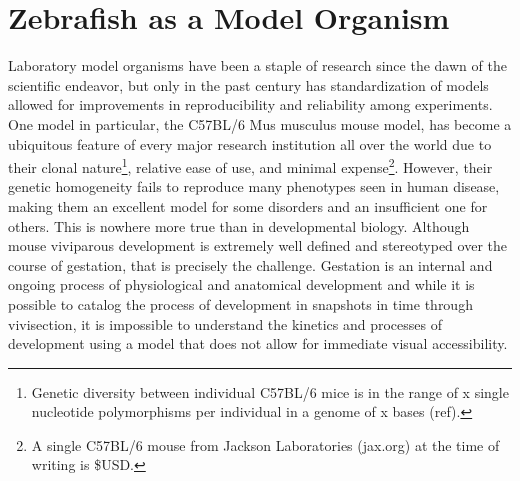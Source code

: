 



\section{Zebrafish as a Model Organism}

Laboratory model organisms have been a staple of research since the dawn of the scientific endeavor, but only in the past century has standardization of models allowed for improvements in reproducibility and reliability among experiments. One model in particular, the C57BL/6 Mus musculus mouse model, has become a ubiquitous feature of every major research institution all over the world due to their clonal nature\footnote{Genetic diversity between individual C57BL/6 mice is in the range of x single nucleotide polymorphisms per individual in a genome of x bases (ref).}, relative ease of use, and minimal expense\footnote{A single C57BL/6 mouse from Jackson Laboratories (jax.org) at the time of writing is \$USD.}. However, their genetic homogeneity fails to reproduce many phenotypes seen in human disease, making them an excellent model for some disorders and an insufficient one for others. This is nowhere more true than in developmental biology. Although mouse viviparous development is extremely well defined and stereotyped over the course of gestation, that is precisely the challenge. Gestation is an internal and ongoing process of physiological and anatomical development and while it is possible to catalog the process of development in snapshots in time through vivisection, it is impossible to understand the kinetics and processes of development using a model that does not allow for immediate visual accessibility. 

